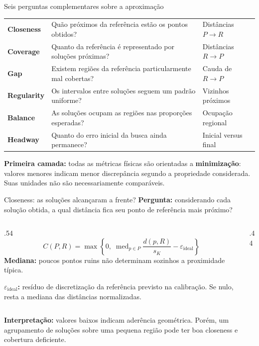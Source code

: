 \begin{frame}{Seis perguntas complementares sobre a aproximação}
\renewcommand{\arraystretch}{1.10}
\begin{tabularx}{\linewidth}{@{}>{\bfseries}p{.20\linewidth}X>{\raggedright\arraybackslash}p{.24\linewidth}@{}}
Closeness & Quão próximos da referência estão os pontos obtidos? & Distâncias $P\to R$\\
Coverage & Quanto da referência é representado por soluções próximas? & Distâncias $R\to P$\\
Gap & Existem regiões da referência particularmente mal cobertas? & Cauda de $R\to P$\\
Regularity & Os intervalos entre soluções seguem um padrão uniforme? & Vizinhos próximos\\
Balance & As soluções ocupam as regiões nas proporções esperadas? & Ocupação regional\\
Headway & Quanto do erro inicial da busca ainda permanece? & Inicial versus final\\
\end{tabularx}
\vspace{.04cm}
\textbf{Primeira camada:} todas as métricas físicas são orientadas a \textbf{minimização}: valores menores indicam menor discrepância segundo a propriedade considerada. Suas unidades não são necessariamente comparáveis.
\end{frame}

\begin{frame}{Closeness: as soluções alcançaram a frente?}
\textbf{Pergunta:} considerando cada solução obtida, a qual distância fica seu ponto de referência mais próximo?
\begin{columns}[T,onlytextwidth]
\begin{column}{.54\textwidth}
\[
\boxed{\displaystyle
C(P,R)=\max\!\left\{0,\;
\operatorname{med}_{p\in P}\frac{d(p,R)}{s_K}-\varepsilon_{\mathrm{ideal}}\right\}}
\]
\textbf{Mediana:} poucos pontos ruins não determinam sozinhos a proximidade típica.
\par\medskip
\textbf{$\varepsilon_{\mathrm{ideal}}$:} resíduo de discretização da referência previsto na calibração. Se nulo, resta a mediana das distâncias normalizadas.
\end{column}
\begin{column}{.44\textwidth}\centering
{}
\FairLegend
\end{column}
\end{columns}
\vspace{.08cm}\textbf{Interpretação:} valores baixos indicam aderência geométrica. Porém, um agrupamento de soluções sobre uma pequena região pode ter boa closeness e cobertura deficiente.
\end{frame}

